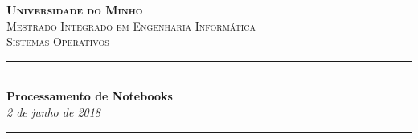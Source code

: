 \begin{titlepage}

\newcommand{\HRule}{\rule{\linewidth}{0.5mm}} %

\center %
 

\textbf{\textsc{\LARGE Universidade do Minho}}\\[1.5cm] %
\textsc{\Large Mestrado Integrado em Engenharia Informática}\\[0.5cm] %
\textsc{\large Sistemas Operativos}\\[0.8cm] %


\HRule \\[0.4cm]
{ \huge \bfseries Processamento de Notebooks}\\[0.4cm]
\Large \emph{2 de junho de 2018} %
\HRule \\[1.5cm]
 



\end{titlepage}
